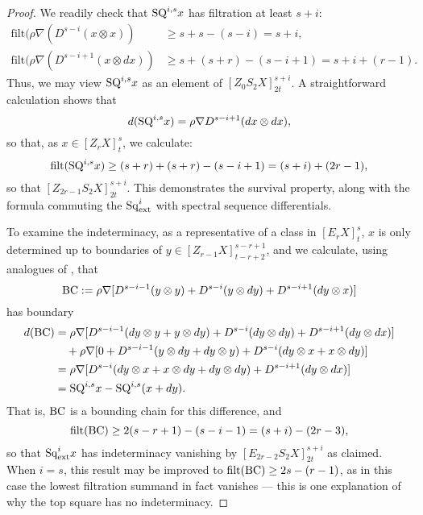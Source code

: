 \documentclass[11pt]{amsart} \renewcommand{\baselinestretch}{1.4}
\theoremstyle{plain}
\theoremstyle{definition}
\newcommand{\Nabla}{\nabla}
\newcommand{\Sq}{\mathrm{Sq}}
\newcommand{\Edownup}[5]{[E_{#1}^{#2}#3]^{#4}_{#5}}
\newcommand{\EZdownup}[5]{[Z^{#2}_{#1}#3]^{#4}_{#5}}
\newcommand{\filt}{\mathrm{filt}}
\begin{document}
\begin{second quadrant homotopy sseq operations}
\begin{proof}
We readily check that $\textup{SQ}^{i,s}x$ has filtration at least $s+i$:
\begin{align*}
\filt(\rho\Nabla (D^{s-i}(x\otimes x))&\geq s+s-(s-i)=s+i,\\
\filt(\rho\Nabla (D^{s-i+1}(x\otimes dx))&\geq s+(s+r)-(s-i+1)=s+i+(r-1).
\end{align*}
Thus, we may view $\textup{SQ}^{i,s}x$ as an element of $\EZdownup{0}{}{S_2X}{s+i}{2t}$. 
A straightforward calculation shows that \[d(\textup{SQ}^{i,s}x)=\rho\Nabla D^{s-i+1}(dx\otimes dx),\] so that, as $x\in \EZdownup{r}{}{X}{s}{t}$, we calculate:
\[\filt(\textup{SQ}^{i,s}x)\geq (s+r)+(s+r)-(s-i+1)=(s+i)+(2r-1),\]
so that $\EZdownup{2r-1}{}{S_2X}{s+i}{2t}$. This demonstrates the survival property, along with the formula commuting the $\Sq^i_\textup{ext}$ with spectral sequence differentials.

To examine the indeterminacy, as a representative of a class in $\Edownup{r}{}{X}{s}{t}$,  $x$ is only determined up to boundaries of $y\in \EZdownup{r-1}{}{X}{s-r+1}{t-r+2}  $, and we calculate, using analogues of \cite[(1.111) and (1.112)]{MR2245560}, that
\[\textup{BC}:=\rho\Nabla [D^{s-i-1}(y\otimes y)+D^{s-i}(y\otimes dy)+D^{s-i+1}(dy\otimes x)]\]
has boundary
\begin{alignat*}{2}
d(\textup{BC})
&=
\rho\Nabla [D^{s-i-1}(dy\otimes y+y\otimes dy)+D^{s-i}(dy\otimes dy)+D^{s-i+1}(dy\otimes dx)]%
\\
&\ \ \ +
\rho\Nabla [0+D^{s-i-1}(y\otimes dy+dy\otimes y)+D^{s-i}(dy\otimes x+x\otimes dy)]%
\\
&=
\rho\Nabla [D^{s-i}(dy\otimes x+x\otimes dy+dy\otimes dy)
+D^{s-i+1}(dy\otimes dx)]\\
&=\textup{SQ}^{i,s}x-\textup{SQ}^{i,s}(x+dy).%
\end{alignat*} 
That is, $\textup{BC}$ is a bounding chain for this difference, and
\[\filt(\textup{BC})\geq 2(s-r+1)-(s-i-1)=(s+i)-(2r-3),\]
so that $\Sq^i_\textup{ext}x$ has indeterminacy vanishing by $\Edownup{2r-2}{}{S_2X}{s+i}{2t}$ as claimed. When $i=s$, this result may be improved to $\filt(\textup{BC})\geq 2s-(r-1)$,  as in this case the lowest filtration summand in fact vanishes --- this is one explanation of why the top square has no indeterminacy.


\end{proof}
\end{second quadrant homotopy sseq operations}
\end{document}
